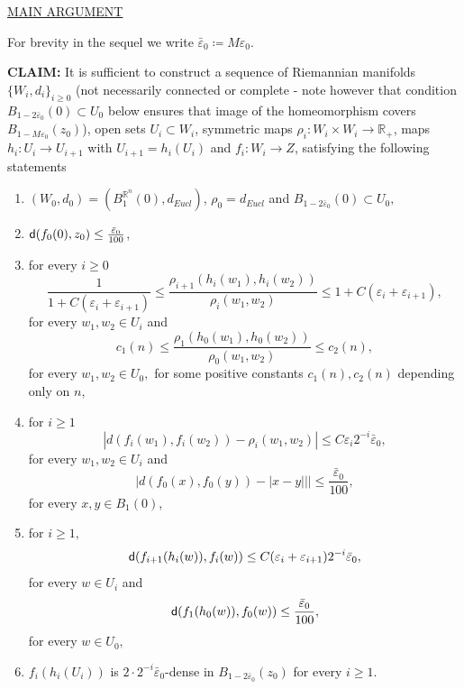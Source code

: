 \documentclass[11pt]{article}
\newcommand{\eps}{\varepsilon}
\newcommand{\rr}{\mathbb{R}}
\newcommand{\sfd}{{\sf d}}
\theoremstyle{plain}
\theoremstyle{definition}
\numberwithin{equation}{section}
\begin{document}
\begin{center}
	\underline{MAIN ARGUMENT} \\
\end{center}


 For brevity in the sequel we write $\bar \eps_0\coloneqq M\eps_0.$

	

\textbf{CLAIM:}	It is sufficient to construct  a sequence of Riemannian manifolds $\{W_i,d_i\}_{i\ge 0}$ (not necessarily connected or complete - note however that condition $B_{1-2\bar \eps_0}(0)\subset U_0$ below  ensures that image of the homeomorphism  covers  $B_{1-M\eps_0}(z_0)$), open sets $U_i \subset W_i$, symmetric maps $\rho_i : W_i \times W_i \to \mathbb{R}_+$,  maps $h_i : U_i \to U_{i+1}$ with $U_{i+1}=h_i(U_i)$ and $f_i: W_i \to Z$,  satisfying the following statements

\begin{enumerate}[label={\alph**)}]
	\item \label{a2)} $(W_0,d_0)=(B_1^{\rr^n}(0),d_{Eucl})$, $\rho_0=d_{Eucl}$ and $B_{1-2\bar \eps_0}(0)\subset U_0,$ 
	\item \label{b2)}$\sfd(f_0(0),z_0)\le \frac{\bar \eps_0}{100}$,
	\item \label{c2)}for every $i \ge 0$
	$$\frac{1}{1+C(\eps_i+\eps_{i+1})}\le\frac{\rho_{i+1}(h_i(w_1),h_i(w_2))}{\rho_i(w_1,w_2)}\le 1+C(\eps_i+\eps_{i+1}),$$
	for every $w_1,w_2 \in U_i$	and
	$$c_1(n)\le\frac{\rho_{1}(h_0(w_1),h_0(w_2))}{\rho_0(w_1,w_2)}\le c_2(n),$$
	for every $w_1,w_2 \in U_0,$ for some positive constants $c_1(n),c_2(n)$ depending only on $n$,
	\item \label{d2)} for $i \ge 1$ 
	$$|d(f_i(w_1),f_i(w_2))-\rho_i(w_1,w_2)|\le C\eps_i2^{-i}\bar \eps_0 ,$$ for every $w_1,w_2 \in U_i$
	and
	$$|d(f_0(x),f_0(y))-|x-y|||\le \frac{\bar \eps_0}{100},$$ for every $x,y \in B_1(0)$,
	\item \label{e2)} for $i \ge 1,$ 
	$$\sfd(f_{i+1}(h_i(w)),f_i(w))\le C(\eps_i+\eps_{i+1})2^{-i} \bar \eps_0 ,$$
	for every $w \in U_i$  and
	$$\sfd(f_{1}(h_0(w)),f_0(w))\le \frac{\bar \eps_0}{100},$$ for every $w \in U_0,$ 
	\item \label{f2)} $f_i(h_i(U_i))$ is $ 2 \cdot 2^{-i}\bar \eps_0 $-dense in $B_{1-2\bar \eps_0}(z_0)$ for every $i \ge 1$.

\end{enumerate}
\end{document}
